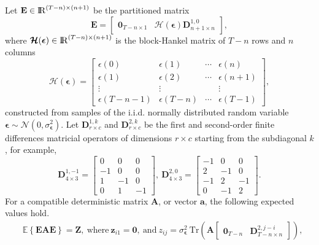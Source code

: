 \begin{lem} \label{lem:lemma1}
Let $\mathbf{E} \in {\rm I\!R}^{\left(T-n\right) \times \left(n+1\right)}$ be the partitioned matrix 
\[ \mathbf{E} = \begin{bmatrix} \mathbf{0}_{T-n \times 1} & \bm{\mathcal{H}}(\bm{\epsilon}) \mathbf{D}_{n+1 \times n}^{1,0} \end{bmatrix}, \]
 where $\bm{\mathcal{H}}(\bm{\epsilon}) \in {\rm I\!R}^{\left(T-n\right) \times \left(n+1\right)}$ is the block-Hankel matrix of $T-n$ rows and $n$ columns
\[ \bm{\mathcal{H}}(\bm{\epsilon}) = \begin{bmatrix} \epsilon(0) & \epsilon(1) & \cdots & \epsilon(n) \\ \epsilon(1) & \epsilon(2) & \cdots & \epsilon(n+1) \\ \vdots & \vdots & & \vdots \\ \epsilon(T-n-1) & \epsilon(T-n) & \cdots & \epsilon(T-1) \end{bmatrix} , \]
constructed from samples of the i.i.d. normally distributed random variable $\bm{\epsilon} \sim \mathcal{N}(0, \sigma_{\bm{\epsilon}}^2)$.
Let $\mathbf{D}_{r \times c}^{1,k}$ and $\mathbf{D}_{r \times c}^{2,k}$ be the first and second-order finite differences matricial operators of dimensions $r \times c$ starting from the subdiagonal $k$, for example, 
\[ \mathbf{D}_{4 \times 3}^{1,-1} = \begin{bmatrix} 0 & 0 & 0 \\ -1 & 0 & 0 \\ 1 & -1 & 0 \\ 0 & 1 & -1 \end{bmatrix}, \ \mathbf{D}_{4 \times 3}^{2,0} = \begin{bmatrix}-1 & 0 & 0 \\ 2 & -1 & 0 \\ - 1 & 2 & -1 \\ 0 & -1 & 2 \end{bmatrix} . \]
For a compatible deterministic matrix $\mathbf{A}$, or vector $\mathbf{a}$, the following expected values hold.
\begin{equation*} \begin{aligned} 
& \mathbb{E} \left\{ \mathbf{E} \mathbf{A} \mathbf{E} \right\} = \mathbf{Z}, \
\text{where} \ \mathbf{z}_{i1} = \mathbf{0}, \ \text{and} \ 
z_{ij} = \sigma_{\bm{\epsilon}}^2 \ \mathrm{Tr} \left( \mathbf{A} \begin{bmatrix} \mathbf{0}_{T-n} & \mathbf{D}_{T-n \times n}^{2, j-i} \end{bmatrix} \right), \\

\end{aligned}
\end{equation*}
\end{lem}
